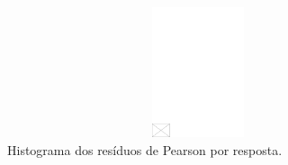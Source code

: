 \documentclass[AMA,STIX1COL]{WileyNJD-v2}
\begin{document}
\begin{figure}[h]
\centerline{\includegraphics[width=342pt,height=9pc,draft]{empty}}
\caption{Histograma dos resíduos de Pearson por resposta.\label{fig4}}
\end{figure}
\end{document}
